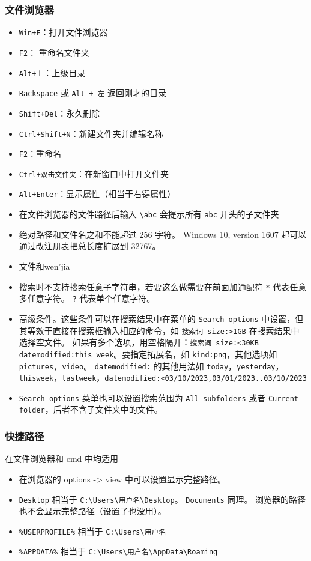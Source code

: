 \subsubsection{文件浏览器}
\begin{itemize}
\item \verb|Win+E|：打开文件浏览器
\item \verb`F2`： 重命名文件夹
\item \verb|Alt+上|：上级目录
\item \verb|Backspace| 或 \verb|Alt + 左| 返回刚才的目录
\item \verb|Shift+Del|：永久删除
\item \verb|Ctrl+Shift+N|：新建文件夹并编辑名称
\item \verb|F2|：重命名
\item \verb|Ctrl+双击文件夹|：在新窗口中打开文件夹
\item \verb`Alt+Enter`：显示属性（相当于右键属性）
\item 在文件浏览器的文件路径后输入 \verb`\abc` 会提示所有 \verb`abc` 开头的子文件夹
\item 绝对路径和文件名之和不能超过 256 字符。 Windows 10, version 1607 起可以通过改注册表把总长度扩展到 32767。
\item 文件和wen'jia
\item 搜索时不支持搜索任意子字符串，若要这么做需要在前面加通配符 \verb`*` 代表任意多任意字符。 \verb`?` 代表单个任意字符。
\item 高级条件。这些条件可以在搜索结果中在菜单的 \verb`Search options` 中设置，但其等效于直接在搜索框输入相应的命令，如 \verb`搜索词 size:>1GB` 在搜索结果中选择空文件。 如果有多个选项，用空格隔开：\verb`搜索词 size:<30KB datemodified:this week`。要指定拓展名，如 \verb`kind:png`，其他选项如 \verb`pictures, video`。 \verb`datemodified:` 的其他用法如 \verb`today`，\verb`yesterday`，\verb`thisweek`，\verb`lastweek`，\verb`datemodified:<03/10/2023,03/01/2023..03/10/2023`
\item \verb`Search options` 菜单也可以设置搜索范围为 \verb`All subfolders` 或者 \verb`Current folder`，后者不含子文件夹中的文件。
\end{itemize}

\subsubsection{快捷路径}
在文件浏览器和 cmd 中均适用
\begin{itemize}
\item 在浏览器的 options -> view 中可以设置显示完整路径。
\item \verb|Desktop| 相当于 \verb|C:\Users\用户名\Desktop|。 \verb|Documents| 同理。 浏览器的路径也不会显示完整路径（设置了也没用）。
\item \verb|%USERPROFILE%| 相当于 \verb|C:\Users\用户名|
\item \verb|%APPDATA%| 相当于 \verb|C:\Users\用户名\AppData\Roaming|
\end{itemize}

